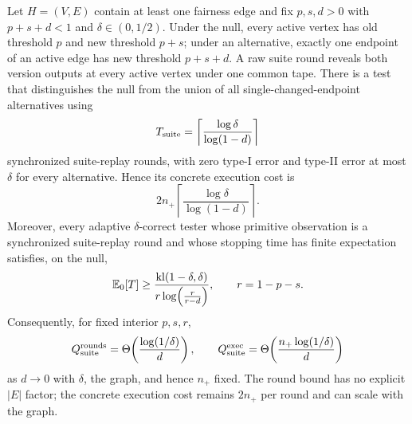 \begin{theorem}
\label{thm:suite-replay}
Let \(H=(V,E)\) contain at least one fairness edge and fix
\(p,s,d>0\) with \(p+s+d<1\) and \(\delta\in(0,1/2)\).  Under the null,
every active vertex has old threshold \(p\) and new threshold \(p+s\); under
an alternative, exactly one endpoint of an active edge has new threshold
\(p+s+d\). A raw suite round
reveals both version outputs at every active vertex under one common tape.
There is a test that distinguishes the null from the union of all
single-changed-endpoint alternatives using
\begin{equation}\label{eq:formal-results-040}
T_{\rm suite}
=
\left\lceil
\frac{\log\delta}{\log(1-d)}
\right\rceil
\end{equation}
synchronized suite-replay rounds, with zero type-I error and type-II error at
most \(\delta\) for every alternative.  Hence its concrete execution cost is
\begin{equation}\label{eq:formal-results-041}
2n_+
\left\lceil
\frac{\log\delta}{\log(1-d)}
\right\rceil.
\end{equation}
Moreover, every adaptive \(\delta\)-correct tester whose primitive observation is
a synchronized suite-replay round and whose stopping time has finite expectation
satisfies, on the null,
\begin{equation}\label{eq:formal-results-042}
\mathbb{E}_0[T]
\ge
\frac{\mathrm{kl}(1-\delta,\delta)}
{r\log\!\left(\frac{r}{r-d}\right)},
\qquad
r=1-p-s.
\end{equation}
Consequently, for fixed interior \(p,s,r\),
\begin{equation}\label{eq:formal-results-043}
Q_{\rm suite}^{\rm rounds}
=
\Theta\!\left(\frac{\log(1/\delta)}{d}\right),
\qquad
Q_{\rm suite}^{\rm exec}
=
\Theta\!\left(
\frac{n_+\log(1/\delta)}{d}
\right)
\end{equation}
as \(d\to0\) with \(\delta\), the graph, and hence \(n_+\) fixed.  The round bound has no explicit \(|E|\) factor; the concrete
execution cost remains $2n_+$ per round and can scale with the graph.
\end{theorem}

